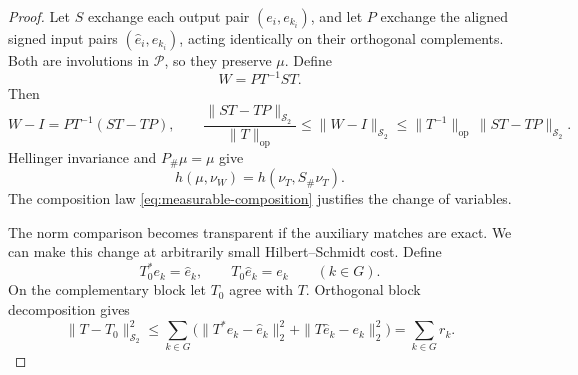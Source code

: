 \begin{proof}
Let $S$ exchange each output pair $(e_i,e_{k_i})$, and let $P$ exchange
the aligned signed input pairs $(\widehat e_i,\widehat e_{k_i})$, acting
identically on their orthogonal complements.  Both are involutions in
$\mathcal P$, so they preserve $\mu$.  Define
\[
 W=P T^{-1} S T.
\]
Then
\begin{equation}
 W-I=P T^{-1}(ST-TP),\qquad
 \frac{\|ST-TP\|_{\mathcal S_2}}{\|T\|_{\mathrm{op}}}
 \leq\|W-I\|_{\mathcal S_2}
 \leq\|T^{-1}\|_{\mathrm{op}}\,\|ST-TP\|_{\mathcal S_2}.
 \label{eq:swap-relative-norm}
\end{equation}
Hellinger invariance and $P_\#\mu=\mu$ give
\begin{equation}
 h(\mu,\nu_W)=h(\nu_T,S_\#\nu_T).
 \label{eq:swap-hellinger-identity}
\end{equation}
The composition law \eqref{eq:measurable-composition} justifies the
change of variables.

The norm comparison becomes transparent if the auxiliary matches are exact.
We can make this change at arbitrarily small Hilbert--Schmidt cost. Define
\[
 T_0^*e_k=\widehat e_k,\qquad T_0\widehat e_k=e_k\qquad(k\in G).
\]
On the complementary block let \(T_0\) agree with \(T\).  Orthogonal block
decomposition
gives
\begin{equation}
 \|T-T_0\|_{\mathcal S_2}^2
 \leq\sum_{k\in G}
       \bigl(\|T^*e_k-\widehat e_k\|_2^2
                    +\|T\widehat e_k-e_k\|_2^2\bigr)
 =\sum_{k\in G}r_k.
\end{equation}


\end{proof}
